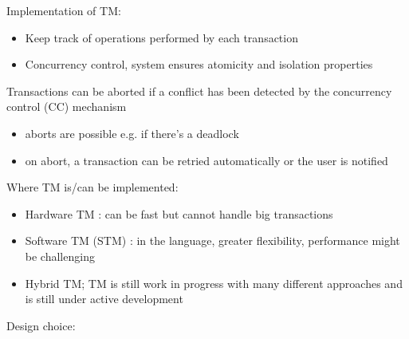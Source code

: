 \documentclass[a4paper]{article}
\begin{document}
\item Implementation of TM:
\begin{itemize}
\item Keep track of operations performed by each transaction
\item Concurrency control, system ensures atomicity and isolation properties
\end{itemize}
\item Transactions can be aborted if a conflict has been detected by the concurrency control (CC) mechanism 
\begin{itemize}
\item aborts are possible e.g. if there’s a deadlock
\item on abort, a transaction can be retried automatically or the user is notified
\end{itemize}
\item Where TM is/can be implemented: 
\begin{itemize}
\item Hardware TM : can be fast but cannot handle big transactions
\item Software TM (STM) : in the language, greater flexibility, performance might be challenging
\item Hybrid TM; TM is still work in progress with many different approaches and is still under active development
\end{itemize}
\item Design choice: 
\end{document}
